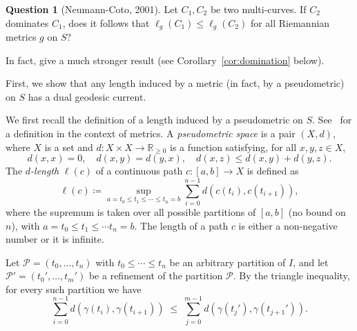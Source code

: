 \documentclass[11pt]{amsart}
\numberwithin{equation}{section}
\numberwithin{figure}{section}
\theoremstyle{definition}
\newtheorem{question}[theorem]{Question}
\theoremstyle{plain}
\begin{document}
\begin{question}[Neumann-Coto, 2001]
Let $C_1,C_2$ be two multi-curves. If $C_2$ dominates $C_1$, does it follows that $\ell_g(C_1) \leq \ell_g(C_2)$ for all Riemannian metrics $g$ on $S$?
\end{question}

In fact, give a much stronger result (see Corollary~\ref{cor:domination} below).

First, we show that any length induced by a metric (in fact, by a pseudometric) on $S$ has a dual geodesic current.

We first recall the definition of a length induced by a pseudometric on $S$. See~\cite[Chapter~I.1]{BH11:NonPosCurvature} for a definition in the context of metrics. A \emph{pseudometric space} is a pair $(X,d)$, where $X$ is a set and $d \colon X \times X \to \mathbb{R}_{\ge 0}$ is a function satisfying, for all $x,y,z \in X$,
\[
d(x,x)=0,\quad d(x,y)=d(y,x),\quad d(x,z)\le d(x,y)+d(y,z).
\]
 The \emph{$d$-length} $\ell(c)$ of a continuous path $c \colon [a,b] \to X$
is defined as
\begin{equation}
\ell(c) \coloneqq \sup_{a=t_0 \leq t_1 \leq \cdots \leq t_n=b} \sum_{i=0}^{n-1} d(c(t_i),c(t_{i+1})),
\label{eq:length_of_path}
\end{equation}
where the supremum is taken over all possible partitions of $[a,b]$ (no bound on $n$), with
$a=t_0 \leq t_1 \leq \cdots t_n = b$.
The length of a path $c$ is either a non-negative number or it is infinite.

Let $\mathcal{P} = (t_0, \dots, t_n)$ with $t_0 \leq \cdots \leq t_n$ be an arbitrary partition of $I$, and let $\mathcal{P}' = (t_0', \dots, t_m')$ be a refinement of the partition $\mathcal{P}$. By the triangle inequality, for every such partition we have
\[
\sum_{i=0}^{n-1} d(\gamma(t_i), \gamma(t_{i+1}))
\;\leq\;
\sum_{j=0}^{m-1} d(\gamma(t_j'), \gamma(t_{j+1}')).
\]
\end{document}
